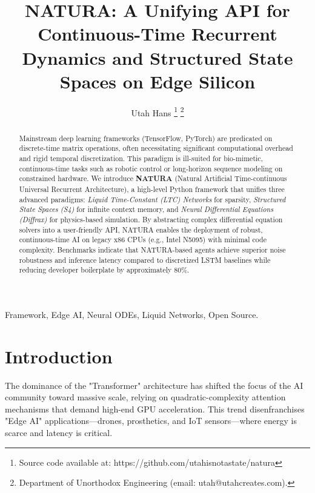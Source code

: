\documentclass[journal]{IEEEtran}
\begin{document}
\title{NATURA: A Unifying API for Continuous-Time Recurrent Dynamics and Structured State Spaces on Edge Silicon}

\author{Utah Hans
\thanks{Source code available at: https://github.com/utahisnotastate/natura}
\thanks{Department of Unorthodox Engineering (email: utah@utahcreates.com).}}

\maketitle

\begin{abstract}

Mainstream deep learning frameworks (TensorFlow, PyTorch) are predicated on discrete-time matrix operations, often necessitating significant computational overhead and rigid temporal discretization. This paradigm is ill-suited for bio-mimetic, continuous-time tasks such as robotic control or long-horizon sequence modeling on constrained hardware. We introduce \textbf{NATURA} (Natural Artificial Time-continuous Universal Recurrent Architecture), a high-level Python framework that unifies three advanced paradigms: \textit{Liquid Time-Constant (LTC) Networks} for sparsity, \textit{Structured State Spaces (S4)} for infinite context memory, and \textit{Neural Differential Equations (Diffrax)} for physics-based simulation. By abstracting complex differential equation solvers into a user-friendly API, NATURA enables the deployment of robust, continuous-time AI on legacy x86 CPUs (e.g., Intel N5095) with minimal code complexity. Benchmarks indicate that NATURA-based agents achieve superior noise robustness and inference latency compared to discretized LSTM baselines while reducing developer boilerplate by approximately 80\%.

\end{abstract}

\begin{IEEEkeywords}
Framework, Edge AI, Neural ODEs, Liquid Networks, Open Source.
\end{IEEEkeywords}

\section{Introduction}
 The dominance of the "Transformer" architecture has shifted the focus of the AI community toward massive scale, relying on quadratic-complexity attention mechanisms that demand high-end GPU acceleration. This trend disenfranchises "Edge AI" applications---drones, prosthetics, and IoT sensors---where energy is scarce and latency is critical.
\end{document}

